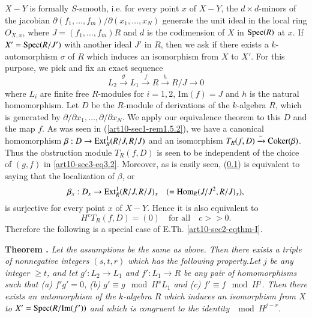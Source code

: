 \subsection{}\label{art10-sec3.1}
$X-Y$ is formally $S$-smooth, i.e. for every point $x$ of $X-Y$, the $d\times d$-minors of the jacobian $\partial(f_{1},\ldots,f_{m})/\partial(x_{1},\ldots,x_{N})$ generate the unit ideal in the local ring $O_{X,x}$, where $J=(f_{1},\ldots,f_{m})R$ and $d$ is the codimension of $X$ in $\operatorname{Spec}(R)$ at $x$. If $X'=\operatorname{Spec}(R/J')$ with another ideal $J'$ in $R$, then we ask if there exists a $k$-automorphism $\sigma$ of $R$ which induces an isomorphism from $X$ to $X'$. For this purpose, we pick and fix an exact sequence
\begin{equation*}
L_{2}\xrightarrow{g}L_{1}\xrightarrow{f}R\xrightarrow{h}R/J\to 0\tag{3.2}\label{art10-sec3-eq3.2}
\end{equation*}
where $L_{i}$ are finite free $R$-modules for $i=1,2$, $\text{Im}(f)=J$ and $h$ is the natural homomorphism. Let $D$ be the $R$-module of derivations of the $k$-algebra $R$, which is generated by $\partial/\partial x_{1},\ldots,\partial/\partial x_{N}$. We apply our equivalence theorem to this $D$ and the map $f$. As was seen in (\ref{art10-sec1-rem1.5.2}), we have a canonical homomorphism $\beta:D\to \operatorname{\mathrm{Ext}}^{1}_{R}(R/J,R/J)$ and an isomorphism $T_{R}(f,D)\xrightarrow{\sim}\operatorname{\mathrm{Coker}}(\beta)$. Thus the obstruction module $T_{R}(f,D)$ is seen to be independent of the choice of $(g,f)$ in \eqref{art10-sec3-eq3.2}. Moreover, as is easily seen, (\ref{art10-sec3.1}) is equivalent to saying that the localization of $\beta$, or
$$
\beta_{x}:D_{x}\to \operatorname{\mathrm{Ext}}^{1}_{R}(R/J,R/J)_{x}\quad (=\operatorname{\mathrm{Hom}}_{R}(J/J^{2},R/J)_{x}),
$$
is surjective for every point $x$ of $X-Y$. Hence it is also equivalent to
\begin{equation*}
H^{c}T_{R}(f,D)=(0)\quad\text{for all}\quad c>>0.\tag{3.3}\label{art10-sec3-eq3.3}
\end{equation*}
Therefore the following is a special case of E.Th. \ref{art10-sec2-eqthm-I}.

\medskip
\noindent
{\bf Theorem .\label{art10-sec3-thm3.3}}
{\em Let the assumptions be the same as above. Then there exists a triple of nonnegative integers $(s,t,r)$ which has the following property.\pageoriginale Let $j$ be any integer $\geq t$, and let $g':L_{2}\to L_{1}$ and $f':L_{1}\to R$ be any pair of homomorphisms such that {\rm(a)} $f'g'=0$, {\rm(b)} $g'\equiv g\mod H^{s}L_{1}$ and {\rm(c)} $f'\equiv f\mod H^{j}$. Then there exists an automorphism of the $k$-algebra $R$ which induces an isomorphism from $X$ to $X'=\operatorname{Spec} (R/\text{\rm Im}(f'))$ and which is congruent to the identity $\mod H^{j-r}$.}

